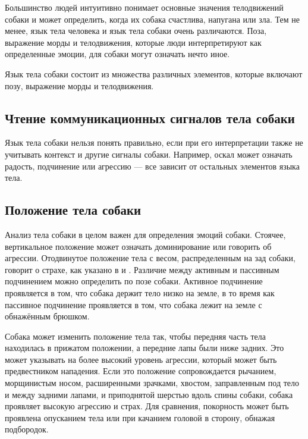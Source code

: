
Большинство людей интуитивно понимает основные значения телодвижений собаки и может определить, когда их собака счастлива, напугана или зла. Тем не менее, язык тела человека и язык тела собаки очень различаются. Поза, выражение морды и телодвижения, которые люди интерпретируют как определенные эмоции, для собаки могут означать нечто иное. 

Язык тела собаки состоит из множества различных элементов, которые включают позу, выражение морды и телодвижения.

\subsection{Чтение коммуникационных сигналов тела собаки}

Язык тела собаки нельзя понять правильно, если при его интерпретации также не учитывать контекст и другие сигналы собаки. Например, оскал может означать радость, подчинение или агрессию — все зависит от остальных элементов языка тела.

\subsection{Положение тела собаки}

Анализ тела собаки в целом важен для определения эмоций собаки. Стоячее, вертикальное положение может означать доминирование или говорить об агрессии. Отодвинутое положение тела с весом, распределенным на зад собаки, говорит о страхе, как указано в  \cite{Simpson1997} и \cite{interpretation}. Различие между активным и пассивным подчинением можно определить по позе собаки. Активное подчинение проявляется в том, что собака держит тело низко на земле, в то время как пассивное подчинение проявляется в том, что собака лежит на земле с обнажённым брюшком\cite{The_Domestic_Dog}.

Собака может изменить положение тела так, чтобы передняя часть тела находилась в прижатом положении, а передние лапы были ниже задних. Это может указывать на более высокий уровень агрессии, который может быть предвестником нападения. Если это положение сопровождается рычанием, морщинистым носом, расширенными зрачками, хвостом, заправленным под тело и между задними лапами, и приподнятой шерстью вдоль спины собаки, собака проявляет высокую агрессию и страх\cite{speak_dog}. Для сравнения, покорность может быть проявлена опусканием тела или при качанием головой в сторону, обнажая подбородок.


